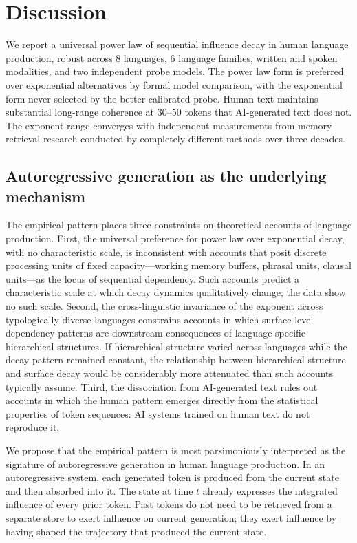 \documentclass[9pt,twocolumn,twoside]{pnas-new}
\begin{document}

\section*{Discussion}

We report a universal power law of sequential influence decay in human language production, robust across 8 languages, 6 language families, written and spoken modalities, and two independent probe models. The power law form is preferred over exponential alternatives by formal model comparison, with the exponential form never selected by the better-calibrated probe. Human text maintains substantial long-range coherence at 30--50 tokens that AI-generated text does not. The exponent range converges with independent measurements from memory retrieval research conducted by completely different methods over three decades.

\subsection*{Autoregressive generation as the underlying mechanism}

The empirical pattern places three constraints on theoretical accounts of language production. First, the universal preference for power law over exponential decay, with no characteristic scale, is inconsistent with accounts that posit discrete processing units of fixed capacity---working memory buffers, phrasal units, clausal units---as the locus of sequential dependency. Such accounts predict a characteristic scale at which decay dynamics qualitatively change; the data show no such scale. Second, the cross-linguistic invariance of the exponent across typologically diverse languages constrains accounts in which surface-level dependency patterns are downstream consequences of language-specific hierarchical structures. If hierarchical structure varied across languages while the decay pattern remained constant, the relationship between hierarchical structure and surface decay would be considerably more attenuated than such accounts typically assume. Third, the dissociation from AI-generated text rules out accounts in which the human pattern emerges directly from the statistical properties of token sequences: AI systems trained on human text do not reproduce it.

We propose that the empirical pattern is most parsimoniously interpreted as the signature of autoregressive generation in human language production. In an autoregressive system, each generated token is produced from the current state and then absorbed into it. The state at time $t$ already expresses the integrated influence of every prior token. Past tokens do not need to be retrieved from a separate store to exert influence on current generation; they exert influence by having shaped the trajectory that produced the current state.
\end{document}
